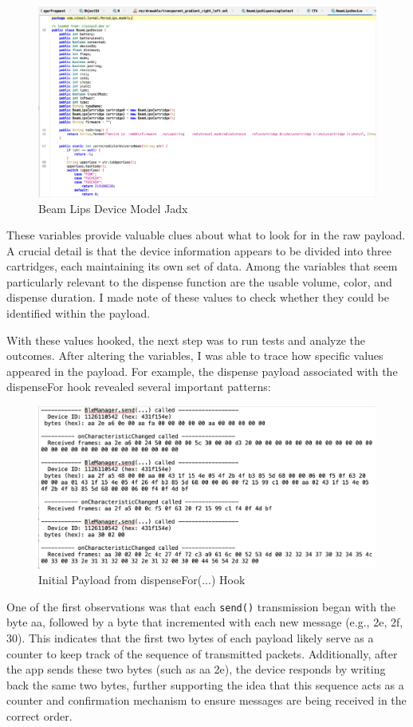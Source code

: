 \begin{figure}[H]
	\centering
	\includegraphics[width=0.7\linewidth]{beamlipsmodel}
	\caption{Beam Lips Device Model Jadx}
	\label{fig:beamlipsmodel}
\end{figure}

These variables provide valuable clues about what to look for in the raw payload. A crucial detail is that the device information appears to be divided into three cartridges, each maintaining its own set of data. Among the variables that seem particularly relevant to the dispense function are the usable volume, color, and dispense duration. I made note of these values to check whether they could be identified within the payload.

With these values hooked, the next step was to run tests and analyze the outcomes. After altering the variables, I was able to trace how specific values appeared in the payload. For example, the dispense payload associated with the dispenseFor hook revealed several important patterns:

\begin{figure}[H]
	\centering
	\includegraphics[width=0.7\linewidth]{payload1}
	\caption{Initial Payload from dispenseFor(...) Hook}
	\label{fig:payload1}
\end{figure}

One of the first observations was that each \texttt{send()} transmission began with the byte aa, followed by a byte that incremented with each new message (e.g., 2e, 2f, 30). This indicates that the first two bytes of each payload likely serve as a counter to keep track of the sequence of transmitted packets. Additionally, after the app sends these two bytes (such as aa 2e), the device responds by writing back the same two bytes, further supporting the idea that this sequence acts as a counter and confirmation mechanism to ensure messages are being received in the correct order.

